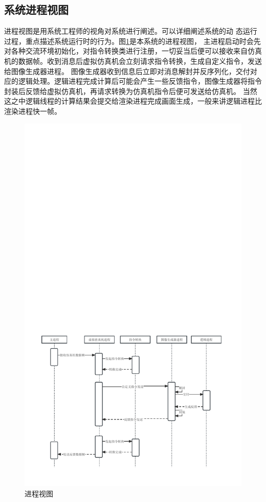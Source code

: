 \subsection{系统进程视图}
进程视图是用系统工程师的视角对系统进行阐述。可以详细阐述系统的动
态运行过程，重点描述系统运行时的行为。图\ref{procedure}是本系统的进程视图，
主进程启动时会先对各种交流环境初始化，对指令转换类进行注册，一切妥当后便可以接收来自仿真机的数据帧。收到消息后虚拟仿真机会立刻请求指令转换，生成自定义指令，发送给图像生成器进程。
图像生成器收到信息后立即对消息解封并反序列化，交付对应的逻辑处理。逻辑进程完成计算后可能会产生一些反馈指令，图像生成器将指令封装后反馈给虚拟仿真机，再请求转换为仿真机指令后便可发送给仿真机。
当然这之中逻辑线程的计算结果会提交给渲染进程完成画面生成，一般来讲逻辑进程比渲染进程快一帧。
\begin{figure}[h]
    \begin{center}
        \includegraphics[width=\textwidth]{pictures/procedure.pdf}
        \caption{进程视图}
        \label{procedure}
    \end{center} 
\end{figure}
